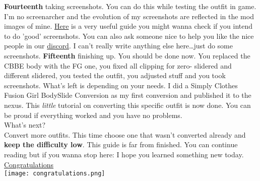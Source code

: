 \textbf{Fourteenth} taking screenshots. You can do this while testing the outfit in game. I'm no screenarcher and the evolution of 
my screenshots are reflected in the mod images of mine. \href{https://steamcommunity.com/sharedfiles/filedetails/?id=172301317}{Here} 
is a very useful guide you might wanna check if you intend to do 'good' screenshots. You can also ask someone nice to help you like 
the nice people in our \href{https://discord.gg/JakcQPN}{discord}. I can't really write anything else here\dots just do some screenshots.
\textbf{Fifteenth} finishing up. You should be done now. You replaced the CBBE body with the FG one, you fixed all clipping for zero-
slidered and different slidered, you tested the outfit, you adjusted stuff and you took screenshots. What's left is depending on your needs.
I did a Simply Clothes Fusion Girl BodySlide Conversion as my first conversion and published it to the nexus. This \textit{little} 
tutorial on converting this specific outfit is now done. You can be proud if everything worked and you have no problems.\\
What's next?\\
Convert more outfits. This time choose one that wasn't converted already and \textbf{keep the difficulty low}. This guide is far from 
finished. You can continue reading but if you wanna stop here: I hope you learned something new today.
\href{https://www.youtube.com/watch?v=3NuFVQk_CCs}{Congratulations}\\
\texttt{[image: congratulations.png]}